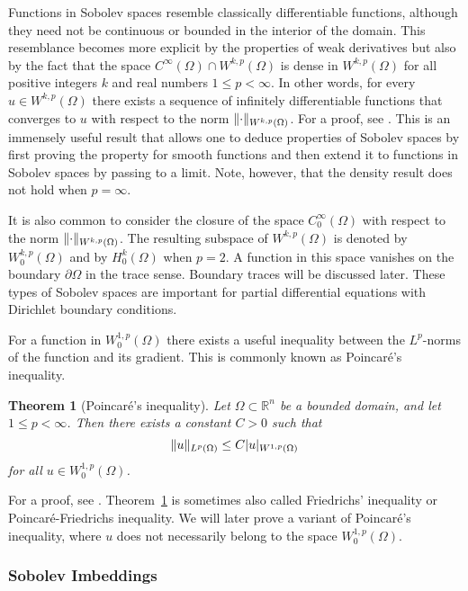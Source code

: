 \documentclass[english, 12pt, a4paper, sci, utf8, a-2b, online]{aaltothesis}
\theoremstyle{definition}
\theoremstyle{plain}
\newtheorem{theorem}{Theorem}[section]
\DeclarePairedDelimiter\abs{\lvert}{\rvert}
\DeclarePairedDelimiter\norm{\lVert}{\rVert}
\numberwithin{equation}{section}
\begin{document}
Functions in Sobolev spaces resemble classically differentiable functions,
although they need not be continuous or bounded in the interior of the domain.
This resemblance becomes more explicit by the properties of
weak derivatives but also by the fact that the space
$C^{\infty}(\Omega) \cap W^{k,p}(\Omega)$ is dense in $W^{k,p}(\Omega)$
for all positive integers $k$ and real numbers $1 \leq p < \infty$.
In other words, for every $u \in W^{k,p}(\Omega)$ there exists a sequence
of infinitely differentiable functions that converges to $u$ with respect
to the norm $\norm{\cdot}_{W^{k,p}(\Omega)}$. For a proof, see
\cite[Theorem 3.17 on p.\ 67]{adams2003}. This is an immensely useful
result that allows one to deduce properties of Sobolev spaces by first
proving the property for smooth functions and then extend it to functions
in Sobolev spaces by passing to a limit. Note, however, that the density result
does not hold when $p=\infty$.

It is also common to consider the closure of the space $C_0^{\infty}(\Omega)$
with respect to the norm $\norm{\cdot}_{W^{k,p}(\Omega)}$. The resulting
subspace of $W^{k,p}(\Omega)$ is denoted by $W_0^{k,p}(\Omega)$ and
by $H_0^k(\Omega)$ when $p=2$.
A function in this space vanishes on the boundary $\partial \Omega$
in the trace sense. Boundary traces will be discussed later.
These types of Sobolev spaces are important for partial differential equations
with Dirichlet boundary conditions.

For a function in $W_0^{1,p}(\Omega)$ there exists a useful inequality
between the $L^p$-norms of the function and its gradient. This is commonly
known as Poincaré's inequality.
\begin{theorem}[Poincaré's inequality]
    \label{thm:poincare_inequality}
    Let $\Omega \subset \mathbb{R}^n$ be a bounded domain,
    and let $1 \leq p < \infty$.
    Then there exists a constant $C > 0$ such that
    \begin{equation*}
        \norm{u}_{L^p(\Omega)} \leq C \abs{u}_{W^{1,p}(\Omega)}
    \end{equation*}
    for all $u \in W_0^{1,p}(\Omega)$.
\end{theorem}
For a proof, see \cite[Theorem 6.30 on p. 183]{adams2003}.
Theorem~\ref{thm:poincare_inequality} is sometimes also called
Friedrichs' inequality or Poincaré-Friedrichs inequality.
We will later prove a variant of Poincaré's inequality,
where $u$ does not necessarily belong to the space $W_0^{1,p}(\Omega)$.

\subsubsection{Sobolev Imbeddings}
\label{subsubsec:sobolevimbeddingtheorem}
\end{document}
